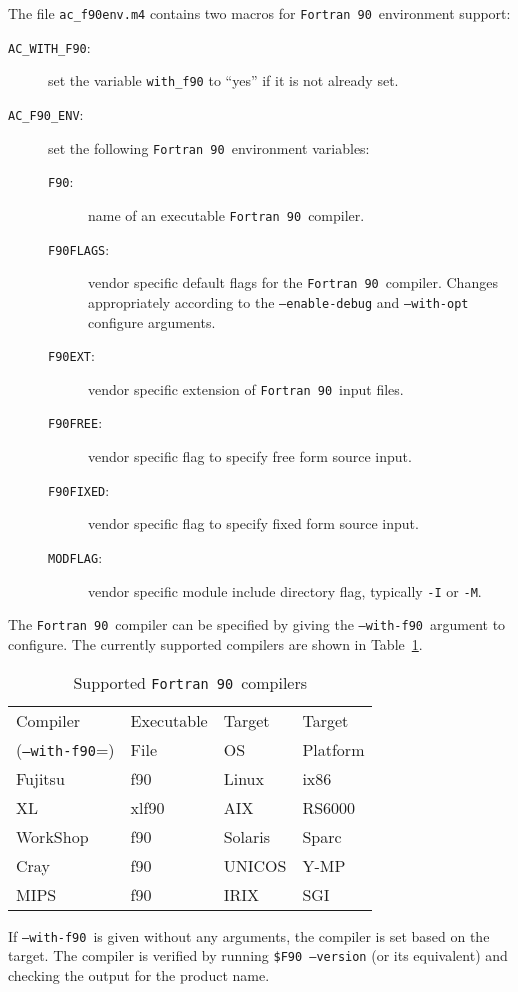 \documentclass[11pt]{nmemo}
\newcommand{\fninety}{\texttt{Fortran~90}}
\newcommand{\withfninety}{\texttt{--with-f90}}
\newcommand{\fninetyenv}{\texttt{AC\_F90\_ENV}}
\begin{document}
The file \texttt{ac\_f90env.m4} contains two macros for \fninety\
environment support:
\begin{description}
\item[\texttt{AC\_WITH\_F90}:] set the variable \texttt{with\_f90} to
``yes'' if it is not already set.
\item[\fninetyenv:] set the following \fninety\ environment variables:
\begin{description}
\item[\texttt{F90}:] name of an executable \fninety\ compiler.
\item[\texttt{F90FLAGS}:] vendor specific default flags for the
\fninety\ compiler.  Changes appropriately according to the
\texttt{--enable-debug} and \texttt{--with-opt} configure arguments.
\item[\texttt{F90EXT}:] vendor specific extension of \fninety\ input files.
\item[\texttt{F90FREE}:] vendor specific flag to specify free form
source input. 
\item[\texttt{F90FIXED}:] vendor specific flag to specify fixed form
source input. 
\item[\texttt{MODFLAG}:] vendor specific module include directory
flag, typically \texttt{-I} or \texttt{-M}.
\end{description}
\end{description}

The \fninety\ compiler can be specified by giving the \withfninety\ 
argument to configure.  The currently supported compilers are shown in
Table~\ref{tbl:compilers}.
\begin{table}[htb]
\hrulefill
\begin{center}
\caption{Supported \fninety\ compilers}\label{tbl:compilers}
\begin{tabular}{l|l|l|l}
Compiler        & Executable & Target  & Target \\
(\withfninety=) & File       & OS      & Platform \\ \hline
Fujitsu         & f90        & Linux   & ix86 \\
XL	        & xlf90      & AIX     & RS6000 \\
WorkShop        & f90	     & Solaris & Sparc \\
Cray            & f90        & UNICOS  & Y-MP \\
MIPS            & f90        & IRIX    & SGI  
\end{tabular}
\end{center}
\hrulefill
\end{table}
If \withfninety\ is given without any arguments, the compiler is set
based on the target.  The compiler is verified by running
\texttt{\$F90 --version} (or its equivalent) and checking the output
for the product name.
\end{document}
